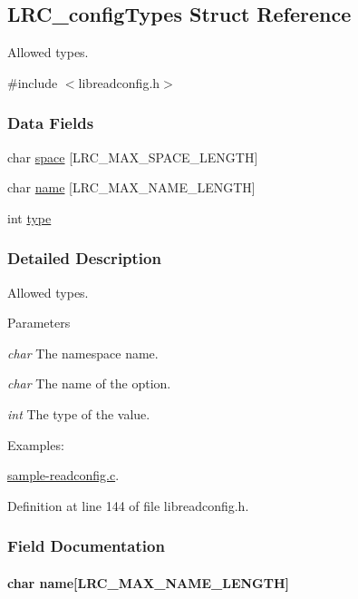 \hypertarget{struct_l_r_c__config_types}{
\subsection{LRC\_\-configTypes Struct Reference}
\label{struct_l_r_c__config_types}
}


Allowed types.  


{\ttfamily \#include $<$libreadconfig.h$>$}\subsubsection*{Data Fields}
\begin{DoxyCompactItemize}
\item 
char \hyperlink{struct_l_r_c__config_types_a4754d9e0429a1914e3617de872b4a736}{space} \mbox{[}LRC\_\-MAX\_\-SPACE\_\-LENGTH\mbox{]}
\item 
char \hyperlink{struct_l_r_c__config_types_a3905a5526840a813b7d9f98268d66ec8}{name} \mbox{[}LRC\_\-MAX\_\-NAME\_\-LENGTH\mbox{]}
\item 
int \hyperlink{struct_l_r_c__config_types_ac765329451135abec74c45e1897abf26}{type}
\end{DoxyCompactItemize}


\subsubsection{Detailed Description}
Allowed types. 
\begin{DoxyParams}{Parameters}
\item[{\em char}]The namespace name.\item[{\em char}]The name of the option.\item[{\em int}]The type of the value. \end{DoxyParams}
\begin{Desc}
\item[Examples: ]\par


\hyperlink{sample-readconfig_8c-example}{sample-\/readconfig.c}.\end{Desc}


Definition at line 144 of file libreadconfig.h.

\subsubsection{Field Documentation}
\hypertarget{struct_l_r_c__config_types_a3905a5526840a813b7d9f98268d66ec8}{
\paragraph[{name}]{\setlength{\rightskip}{0pt plus 5cm}char {\bf name}\mbox{[}LRC\_\-MAX\_\-NAME\_\-LENGTH\mbox{]}}\hfill}
\label{struct_l_r_c__config_types_a3905a5526840a813b7d9f98268d66ec8}


